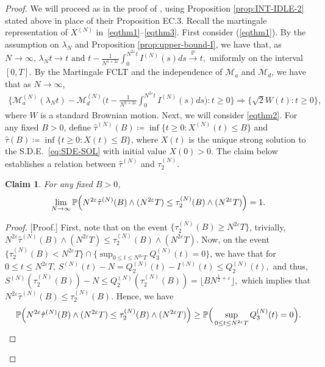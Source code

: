 \documentclass[11pt, reqno]{article}
\DeclarePairedDelimiter\autobracket{(}{)}
\newcommand{\br}[1]{\autobracket*{#1}}
\newtheorem{claim}[theorem]{Claim}
\numberwithin{equation}{section}
\numberwithin{theorem}{section}
\let\plainqed\qedsymbol
\newcommand{\claimqed}{$\lrcorner$}
\newenvironment{claimproof}{\begin{proof}\renewcommand{\qedsymbol}{\claimqed}}{\end{proof}\renewcommand{\qedsymbol}{\plainqed}}
\newcommand{\pto}{\ensuremath{\xrightarrow{\ \mathbb{P}\ }}}  %
\newcommand{\PP}{\mathbb{P}}  				%
\begin{document}
\begin{proof}
We will proceed as in the proof of \cite[Theorem 1]{GW19}, using Proposition \ref{prop:INT-IDLE-2} stated above in place of their Proposition EC.3. 
Recall the martingale representation of $X^{(N)}$ in~\eqref{eqthm1}--\eqref{eqthm3}.
First consider (\ref{eqthm1}). 
By the assumption on $\lambda_N$ and Proposition \ref{prop:upper-bound-I}, we have that, as $N\rightarrow\infty$,
$
    \lambda_N t\rightarrow t\text{ and } t-\frac{1}{N^{1+2\varepsilon}} \int_0^{N^{2\varepsilon}t} I^{(N)}(s)ds\pto t,
$
uniformly on the interval $[0,T]$.
By the Martingale FCLT \cite{whitt07} and the independence of $\mathcal{M}_a$ and $\mathcal{M}_d$, we have that as $N\rightarrow\infty$,
\begin{align*}
    \Big\{\mathcal{M}_a^{(N)}(\lambda_N t)-\mathcal{M}_d^{(N)}\Big( t-\frac{1}{N^{1+2\varepsilon}} \int_0^{N^{2\varepsilon}t} I^{(N)}(s)ds\Big): t\geq0\Big\}\Rightarrow
    \Big\{\sqrt{2}W(t): t\geq0\Big\},
\end{align*} 
where $W$ is a standard Brownian motion.
Next, we will consider \eqref{eqthm2}. 
For any fixed $B>0$, define $\hat{\tau}^{(N)}(B)\coloneqq\inf\{t\geq0:X^{(N)}(t)\leq B\}$ and $\hat{\tau}(B)\coloneqq\inf\{t\geq 0: X(t)\leq B\}$, where $X(t)$ is the unique strong solution to the S.D.E.~\eqref{eq:SDE-SOL} with initial value $X(0)>0$.
The claim below establishes a relation between $\hat{\tau}^{(N)}$ and $\tau^{(N)}_2$.
\begin{claim}\label{claim:tau-tau2}
For any fixed $B>0$,
$$\lim_{N\rightarrow\infty}\PP\br{N^{2\varepsilon}\hat{\tau}^{(N)}(B)\wedge (N^{2\varepsilon}T)\leq \tau^{(N)}_2(B)\wedge (N^{2\varepsilon}T)}=1.$$ 
\end{claim}
\begin{claimproof}[Proof.]
First, note that on the event $\big\{\tau^{(N)}_2(B)\geq  N^{2\varepsilon}T\big\}$, trivially,
$N^{2\varepsilon}\hat{\tau}^{(N)}(B)\wedge (N^{2\varepsilon}T)\leq \tau^{(N)}_2(B)\wedge (N^{2\varepsilon}T).$
Now, on the event $\big\{\tau^{(N)}_2(B)< N^{2\varepsilon}T\big\}\cap
\big\{\sup_{0\leq t\leq N^{2\varepsilon}T}Q^{(N)}_3(t)=0\big\}$, we have that for $0\leq t\leq N^{2\varepsilon}T$,
$S^{(N)}(t)-N=Q^{(N)}_2(t)-I^{(N)}(t)\leq Q^{(N)}_2(t),$
and thus,
$S^{(N)}(\tau^{(N)}_2(B))-N\leq Q^{(N)}_2(\tau^{(N)}_2(B))= \lfloor BN^{\frac{1}{2}+ \varepsilon}\rfloor,$
which implies that $N^{2\varepsilon}\hat{\tau}^{(N)}(B)\leq \tau^{(N)}_2(B)$.
Hence, we have 
\begin{align}\label{eq:claim-6.7}
\PP\br{N^{2\varepsilon}\hat{\tau}^{(N)}(B)\wedge (N^{2\varepsilon}T)\leq \tau^{(N)}_2(B)\wedge (N^{2\varepsilon}T)}\geq \PP\Big(\sup_{0\leq t\leq N^{2\varepsilon}T}Q^{(N)}_3(t)=0\Big).

\end{align}
\end{claimproof}
\end{proof}
\end{document}

